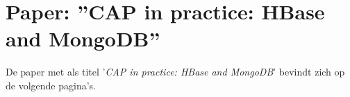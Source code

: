 \chapter{Paper: ''CAP in practice: HBase and MongoDB''}\label{sec:paper}
De paper met als titel '\textit{CAP in practice: HBase and MongoDB}' bevindt zich op de volgende pagina's. 
